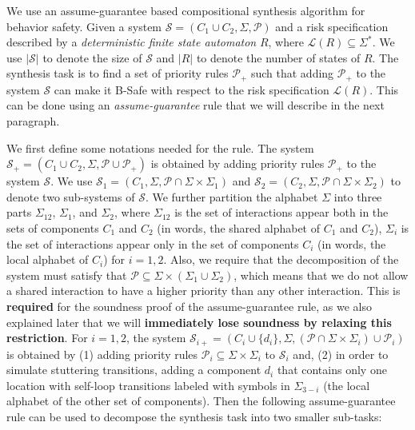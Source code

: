 \documentclass[10pt, a4paper, onecolumn, conference, compsocconf]{IEEEtran}
\begin{document}
We use an assume-guarantee based compositional synthesis algorithm for behavior safety. Given a system $\mathcal{S} = (C_1 \cup C_2 , \Sigma, \mathcal{P})$ and a risk specification described by a \textit{deterministic finite state automaton} $R$, where $\mathcal{L}(R)\subseteq \Sigma^*$. We use $|\mathcal{S}|$ to denote the size of $\mathcal{S}$ and $|R|$ to denote the number of states of $R$.
The synthesis task is to find a set of priority rules $\mathcal{P}_{+}$ such that adding $\mathcal{P}_{+}$ to the system $\mathcal{S}$ can make it B-Safe with respect to the risk specification $\mathcal{L}(R)$. This can be done using an \emph{assume-guarantee} rule that we will describe in the next paragraph.

We first define some notations needed for the rule. The system $\mathcal{S}_{+} = (C_1 \cup C_2 , \Sigma, \mathcal{P} \cup \mathcal{P}_{+})$ is obtained by adding priority rules $\mathcal{P}_{+}$ to the system $\mathcal{S}$.
We use $\mathcal{S}_1 = (C_1 , \Sigma, \mathcal{P}\cap \Sigma\times\Sigma_1)$ and $\mathcal{S}_2 = (C_2 , \Sigma, \mathcal{P}\cap \Sigma\times\Sigma_2)$ to denote two sub-systems of $\mathcal{S}$. We further partition the alphabet $\Sigma$ into three parts $\Sigma_{12}$, $\Sigma_1$, and $\Sigma_2$, where $\Sigma_{12}$ is the set of interactions appear both in the sets of components $C_1$ and $C_2$ (in words, the shared alphabet of $C_1$ and $C_2$), $\Sigma_{i}$ is the set of interactions appear only in the set of components $C_i$ (in words, the local alphabet of $C_i$) for $i=1,2$. Also, we require that the decomposition of the system must satisfy that $\mathcal{P} \subseteq \Sigma\times(\Sigma_1 \cup \Sigma_2)$, which means that we do not allow a shared interaction to have a higher priority than any other interaction.
This is \textbf{required} for the soundness proof of the assume-guarantee rule, as we also explained later
that we will \textbf{immediately lose soundness by relaxing this restriction}.
For $i=1,2$, the system $\mathcal{S}_{i+}=(C_i \cup \{d_i\} , \Sigma, (\mathcal{P}\cap \Sigma\times\Sigma_i) \cup \mathcal{P}_i)$ is obtained by (1) adding priority rules $\mathcal{P}_{i}\subseteq \Sigma \times\Sigma_i$ to $\mathcal{S}_i$ and, (2) in order to simulate stuttering transitions, adding a component $d_i$ that contains only one location with self-loop transitions labeled with symbols in $\Sigma_{3-i}$ (the local alphabet of the other set of components).
Then the following assume-guarantee rule can be used to decompose the synthesis task into two smaller sub-tasks:
\end{document}
